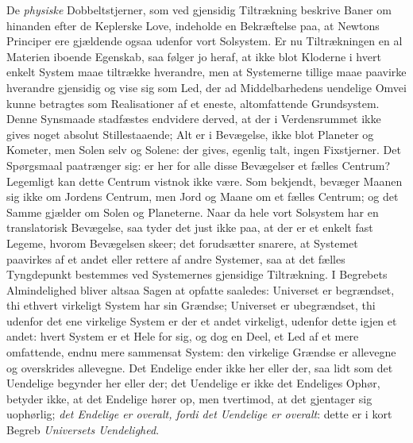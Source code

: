 \documentclass[12pt,a4paper]{book}
\begin{document}
De \emph{physiske} Dobbeltstjerner, som ved gjensidig Tiltrækning
beskrive Baner om hinanden efter de Keplerske Love, indeholde en
Bekræftelse paa, at Newtons Principer
ere gjældende ogsaa udenfor vort Solsystem. Er nu Tiltrækningen en al
Materien iboende Egenskab, saa følger jo heraf, at ikke blot Kloderne i
hvert enkelt System maae tiltrække hverandre, men at Systemerne tillige
maae paavirke hverandre gjensidig og vise sig som Led, der ad
Middelbarhedens uendelige Omvei kunne betragtes som Realisationer af et
eneste, altomfattende Grundsystem. Denne Synsmaade stadfæstes endvidere
derved, at der i Verdensrummet ikke gives noget absolut Stillestaaende;
Alt er i Bevægelse, ikke blot Planeter og Kometer, men Solen selv og
Solene: der gives, egenlig talt, ingen Fixstjerner. Det Spørgsmaal
paatrænger sig: er her for alle disse Bevægelser et fælles Centrum?
Legemligt kan dette Centrum vistnok ikke være. Som bekjendt, bevæger
Maanen sig ikke om Jordens Centrum, men Jord og Maane om et fælles
Centrum; og det Samme gjælder om Solen og Planeterne. Naar da hele vort
Solsystem har en translatorisk Bevægelse, saa tyder det just ikke paa,
at der er et enkelt fast Legeme, hvorom Bevægelsen skeer; det
forudsætter snarere, at Systemet paavirkes af et andet eller rettere af
andre Systemer, saa at det fælles Tyngdepunkt bestemmes ved Systemernes
gjensidige Tiltrækning. I Begrebets Almindelighed bliver altsaa Sagen
at opfatte saaledes: Universet er begrændset, thi ethvert virkeligt
System har sin Grændse; Universet er ubegrændset, thi udenfor det ene
virkelige System er der et andet virkeligt, udenfor dette igjen et
andet: hvert System er et Hele for sig, og dog en Deel, et Led af et
mere omfattende, endnu mere sammensat System: den virkelige Grændse er
allevegne og overskrides allevegne. Det Endelige ender ikke her eller
der, saa lidt som det Uendelige begynder her eller der; det Uendelige
er ikke det Endeliges Ophør, betyder ikke, at det Endelige hører op,
men tvertimod, at det gjentager sig uophørlig; \emph{det Endelige er
overalt, fordi det Uendelige er overalt}: dette er i kort Begreb
\emph{Universets Uendelighed}.
\end{document}
